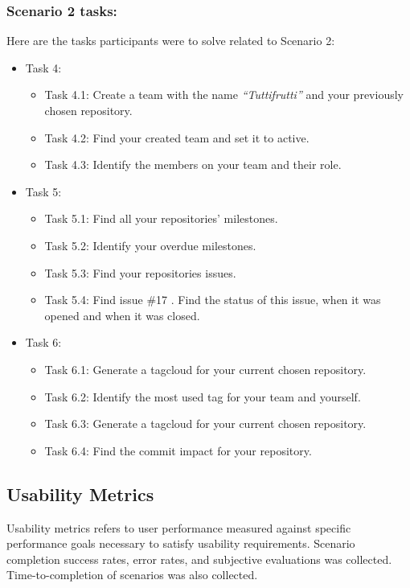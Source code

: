 \subsubsection{Scenario 2 tasks:}
Here are the tasks participants were to solve related to Scenario 2:
\begin{itemize}
\item Task 4:
	\begin{itemize}
		\item Task 4.1: Create a team with the name \emph{“Tuttifrutti”} and your previously chosen repository.
		\item Task 4.2: Find your created team and set it to active.
		\item Task 4.3: Identify the members on your team and their role.
	\end{itemize}
\item Task 5:
	\begin{itemize}
		\item Task 5.1: Find all your repositories’ milestones.
		\item Task 5.2: Identify your overdue milestones.
		\item Task 5.3: Find your repositories issues.
		\item Task 5.4: Find issue \#17 . Find the status of this issue, when it was opened and when it was closed.
	\end{itemize}
\item Task 6:
	\begin{itemize}
		\item Task 6.1: Generate a tagcloud for your current chosen repository.
		\item Task 6.2: Identify the most used tag for your team and yourself.
		\item Task 6.3: Generate a tagcloud for your current chosen repository.
		\item Task 6.4: Find the commit impact for your repository.
	\end{itemize}
\end{itemize}

\subsection{Usability Metrics}
Usability metrics refers to user performance measured against specific performance goals necessary to satisfy usability requirements. Scenario completion success rates, error rates, and subjective evaluations was collected. Time-to-completion of scenarios was also collected.

